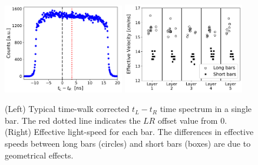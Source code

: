 \documentclass[3p,final,twocolumn]{elsarticle}
\begin{document}
\begin{figure}[tb]
	\centering
		\includegraphics[width=0.47\textwidth]{lr-offset.pdf}
		\includegraphics[width=0.47\textwidth]{eff_vel.pdf}
                \caption{ (Left) Typical time-walk corrected $t_{L} -
                  t_{R}$ time spectrum in a single bar. The red
                  dotted line indicates the $LR$ offset value from
                  0. (Right) Effective light-speed for each
                  bar. The differences in effective speeds between
                  long bars (circles) and short bars (boxes) are due
                  to geometrical effects.}
	\label{fig:eff_vel}
\end{figure}

\end{document}
